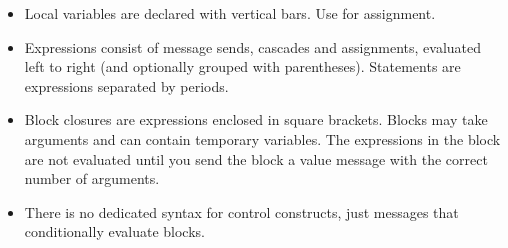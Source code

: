 \documentclass[10pt,twoside,english]{_support/latex/sbabook/sbabook}
\begin{document}
\begin{itemize}
\item Local variables are declared with vertical bars. Use \textcode{:= } for assignment. 
\item Expressions consist of message sends, cascades and assignments, evaluated left to right (and optionally grouped with parentheses). Statements are expressions separated by periods.
\item Block closures are expressions enclosed in square brackets. Blocks may take arguments and can contain temporary variables. The expressions in the block are not evaluated until you send the block a value message with the correct number of arguments. 
\item There is no dedicated syntax for control constructs, just messages that conditionally evaluate blocks.
\end{itemize}


\backmatter



\end{document}

